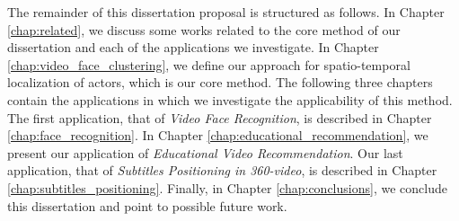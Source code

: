 The remainder of this dissertation proposal is structured as follows. 
In Chapter \ref{chap:related}, we discuss some works related to the core method of our dissertation and each of the applications we investigate.
In Chapter \ref{chap:video_face_clustering}, we define our approach for spatio-temporal localization of actors, which is our core method.
The following three chapters contain the applications in which we investigate the applicability of this method.
The first application, that of \emph{Video Face Recognition}, is described in Chapter \ref{chap:face_recognition}.
In Chapter \ref{chap:educational_recommendation}, we present our application of \emph{Educational Video Recommendation}.
Our last application, that of \emph{Subtitles Positioning in 360-video}, is described in Chapter \ref{chap:subtitles_positioning}. Finally, in Chapter \ref{chap:conclusions}, we conclude this dissertation and point to possible future work.